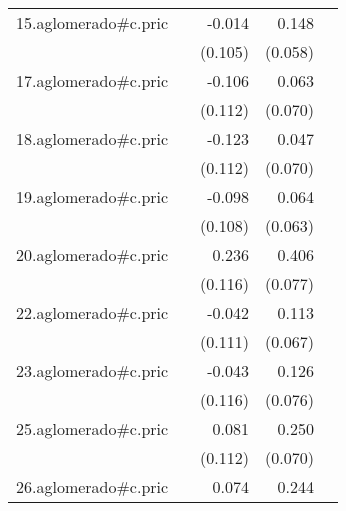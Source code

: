 {\begin{longtable}{l*{4}{D{.}{.}{-1}}}
\addlinespace
15.aglomerado#c.pric&                     &      -0.014         &       0.148\sym{*}  &                     \\
            &                     &     (0.105)         &     (0.058)         &                     \\
\addlinespace
17.aglomerado#c.pric&                     &      -0.106         &       0.063         &                     \\
            &                     &     (0.112)         &     (0.070)         &                     \\
\addlinespace
18.aglomerado#c.pric&                     &      -0.123         &       0.047         &                     \\
            &                     &     (0.112)         &     (0.070)         &                     \\
\addlinespace
19.aglomerado#c.pric&                     &      -0.098         &       0.064         &                     \\
            &                     &     (0.108)         &     (0.063)         &                     \\
\addlinespace
20.aglomerado#c.pric&                     &       0.236\sym{*}  &       0.406\sym{***}&                     \\
            &                     &     (0.116)         &     (0.077)         &                     \\
\addlinespace
22.aglomerado#c.pric&                     &      -0.042         &       0.113         &                     \\
            &                     &     (0.111)         &     (0.067)         &                     \\
\addlinespace
23.aglomerado#c.pric&                     &      -0.043         &       0.126         &                     \\
            &                     &     (0.116)         &     (0.076)         &                     \\
\addlinespace
25.aglomerado#c.pric&                     &       0.081         &       0.250\sym{***}&                     \\
            &                     &     (0.112)         &     (0.070)         &                     \\
\addlinespace
26.aglomerado#c.pric&                     &       0.074         &       0.244\sym{***}&                     \\

\end{longtable}}
